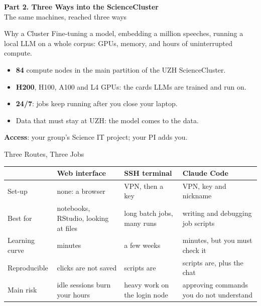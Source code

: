 \documentclass[svgnames,x11names,dvipsnames]{beamer}
\newcommand{\chg}[1]{{\bfseries #1}}
\renewcommand{\chg}[1]{#1}
\newcommand{\sectionslide}[2]{%
\begin{frame}[plain]
  \centering
  \vfill
  {\LARGE \textbf{\textcolor{titleblue}{#1}}}\\[0.4cm]
  {#2}
  \vfill
\end{frame}}
\begin{document}
\sectionslide{Part 2. Three Ways into the ScienceCluster}{The same machines, reached three ways}

\begin{frame}{\chg{Why a Cluster}}
\small
Fine-tuning a model, embedding a million speeches, running a local LLM on a whole corpus: GPUs, memory, and hours of uninterrupted compute.

\vspace{0.5cm}
\begin{itemize}
    \setlength{\itemsep}{6pt}
    \item \textbf{84} compute nodes in the main partition of the UZH ScienceCluster.
    \item \textbf{H200}, H100, A100 and L4 GPUs: the cards LLMs are trained and run on.
    \item \textbf{24/7}: jobs keep running after you close your laptop.
    \item Data that must stay at UZH: the model comes to the data.
\end{itemize}

\vspace{0.5cm}
\textbf{Access}: your group's Science IT project; your PI adds you.
\end{frame}

\begin{frame}{\chg{Three Routes, Three Jobs}}
\footnotesize
\renewcommand{\arraystretch}{1.5}
\begin{tabular}{@{}>{\raggedright\arraybackslash}p{1.9cm}>{\raggedright\arraybackslash}p{2.6cm}>{\raggedright\arraybackslash}p{2.6cm}>{\raggedright\arraybackslash}p{2.9cm}@{}}
\toprule
& \textbf{Web interface} & \textbf{SSH terminal} & \textbf{Claude Code} \\
\midrule
Set-up & none: a browser & VPN, then a key & VPN, key and nickname \\
Best for & notebooks, RStudio, looking at files & long batch jobs, many runs & writing and debugging job scripts \\
Learning curve & minutes & a few weeks & minutes, but you must check it \\
Reproducible & clicks are not saved & scripts are & scripts are, plus the chat \\
Main risk & idle sessions burn your hours & heavy work on the login node & approving commands you do not understand \\
\bottomrule
\end{tabular}
\end{frame}
\end{document}
